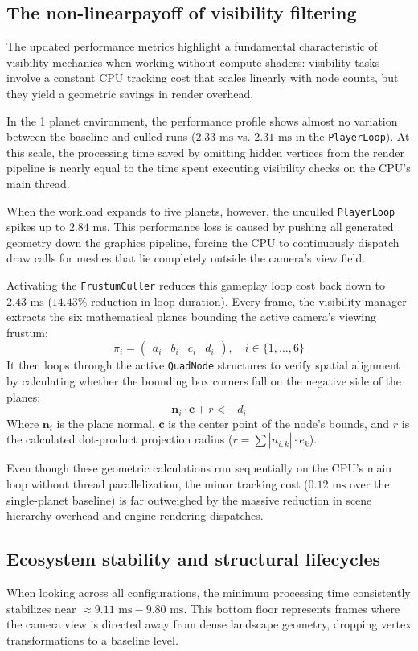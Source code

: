 \documentclass[12pt]{report}
\begin{document}
\subsection{The non-linearpayoff of visibility filtering}
The updated performance metrics highlight a fundamental characteristic of visibility mechanics when working without compute shaders: visibility tasks involve a constant CPU tracking cost that scales linearly with node counts, but they yield a geometric savings in render overhead.

In the 1 planet environment, the performance profile shows almost no variation between the baseline and culled runs ($2.33\text{ ms}$ vs. $2.31\text{ ms}$ in the \texttt{PlayerLoop}). At this scale, the processing time saved by omitting hidden vertices from the render pipeline is nearly equal to the time spent executing visibility checks on the CPU's main thread.

When the workload expands to five planets, however, the unculled \texttt{PlayerLoop} spikes up to $2.84\text{ ms}$. This performance loss is caused by pushing all generated geometry down the graphics pipeline, forcing the CPU to continuously dispatch draw calls for meshes that lie completely outside the camera's view field. 

Activating the \texttt{FrustumCuller} reduces this gameplay loop cost back down to $2.43\text{ ms}$ ($14.43\%$ reduction in loop duration). Every frame, the visibility manager extracts the six mathematical planes bounding the active camera's viewing frustum:
$$\pi_i = \begin{pmatrix} a_i & b_i & c_i & d_i \end{pmatrix}, \quad i \in \{1, \dots, 6\}$$
It then loops through the active \texttt{QuadNode} structures to verify spatial alignment by calculating whether the bounding box corners fall on the negative side of the planes:
$$\mathbf{n}_i \cdot \mathbf{c} + r < -d_i$$
Where $\mathbf{n}_i$ is the plane normal, $\mathbf{c}$ is the center point of the node's bounds, and $r$ is the calculated dot-product projection radius ($r = \sum |n_{i,k}| \cdot e_k$).

Even though these geometric calculations run sequentially on the CPU's main loop without thread parallelization, the minor tracking cost ($0.12\text{ ms}$ over the single-planet baseline) is far outweighed by the massive reduction in scene hierarchy overhead and engine rendering dispatches.

\subsection{Ecosystem stability and structural lifecycles}
When looking across all configurations, the minimum processing time consistently stabilizes near $\approx 9.11\text{ ms} - 9.80\text{ ms}$. This bottom floor represents frames where the camera view is directed away from dense landscape geometry, dropping vertex transformations to a baseline level. 
\end{document}
